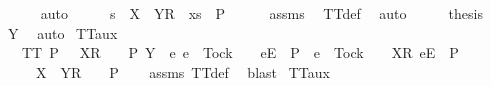 \begin{isabellebody}
\ \ \ \ \isamarkupfalse%
\ auto\isanewline
\ \ \isamarkupfalse%
\ \isamarkupfalse%
\ {\isachardoublequoteopen}s\ {\isacharat}\ {\isacharbrackleft}{\isacharbrackleft}X\ {\isasymunion}\ Y{\isacharbrackright}\isactrlsub R{\isacharbrackright}\ {\isacharat}\ xs\ {\isasymin}\ P{\isachardoublequoteclose}\isanewline
\ \ \ \ \isamarkupfalse%
\ assms\ \isamarkupfalse%
\ TT{}{\isacharunderscore}def\ \isamarkupfalse%
\ auto\isanewline
\ \ \isamarkupfalse%
\ \isamarkupfalse%
\ {\isacharquery}thesis\ \isamarkupfalse%
\ Y\ \isamarkupfalse%
\ auto\isanewline
{}\isamarkupfalse%
%
\endisatagproof
{\isafoldproof}%
%
\isadelimproof
\isanewline
%
\endisadelimproof
\isanewline
{}\isamarkupfalse%
\ TT{}{\isacharunderscore}aux{}{\isacharcolon}\isanewline
\ \ \ {\isachardoublequoteopen}TT{}\ P{\isachardoublequoteclose}\ {\isachardoublequoteopen}{\isasymrho}\ {\isacharat}\ {\isacharbrackleft}{\isacharbrackleft}X{\isacharbrackright}\isactrlsub R{\isacharbrackright}\ {\isacharat}\ {\isasymsigma}\ {\isasymin}\ P{\isachardoublequoteclose}\ {\isachardoublequoteopen}Y\ {\isasyminter}\ {\isacharbraceleft}e{\isachardot}\ {\isacharparenleft}e\ {\isasymnoteq}\ Tock\ {\isasymand}\ {\isasymrho}\ {\isacharat}\ {\isacharbrackleft}{\isacharbrackleft}e{\isacharbrackright}\isactrlsub E{\isacharbrackright}\ {\isasymin}\ P{\isacharparenright}\ {\isasymor}\ {\isacharparenleft}e\ {\isacharequal}\ Tock\ {\isasymand}\ {\isasymrho}\ {\isacharat}\ {\isacharbrackleft}{\isacharbrackleft}X{\isacharbrackright}\isactrlsub R{\isacharcomma}\ {\isacharbrackleft}e{\isacharbrackright}\isactrlsub E{\isacharbrackright}\ {\isasymin}\ P{\isacharparenright}\ {\isacharbraceright}\ {\isacharequal}\ {\isacharbraceleft}{\isacharbraceright}{\isachardoublequoteclose}\isanewline
\ \ \ {\isachardoublequoteopen}{\isasymrho}\ {\isacharat}\ {\isacharbrackleft}{\isacharbrackleft}X\ {\isasymunion}\ Y{\isacharbrackright}\isactrlsub R{\isacharbrackright}\ {\isacharat}\ {\isasymsigma}\ {\isasymin}\ P{\isachardoublequoteclose}\isanewline
%
\isadelimproof
\ \ %
\endisadelimproof
%
\isatagproof
{}\isamarkupfalse%
\ assms\ TT{}{\isacharunderscore}def\ \isamarkupfalse%
\ blast%
\endisatagproof
{\isafoldproof}%
%
\isadelimproof
\isanewline
%
\endisadelimproof
\isanewline
{}\isamarkupfalse%
\ TT{}{\isacharunderscore}aux{}{\isacharcolon}\isanewline

\end{isabellebody}

